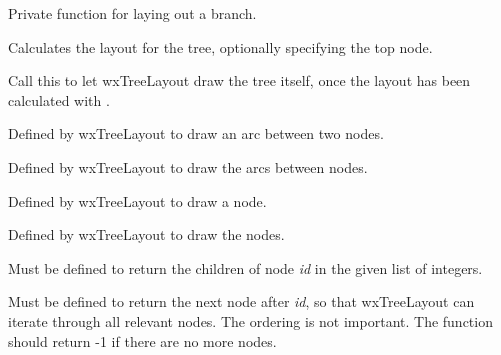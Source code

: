 

Private function for laying out a branch.

\label{dolayout}


Calculates the layout for the tree, optionally specifying the top node.

\label{draw}


Call this to let wxTreeLayout draw the tree itself, once the layout has been
calculated with .



Defined by wxTreeLayout to draw an arc between two nodes.



Defined by wxTreeLayout to draw the arcs between nodes.



Defined by wxTreeLayout to draw a node.



Defined by wxTreeLayout to draw the nodes.

\label{getchildren}


Must be defined to return the children of node {\it id} in the given list
of integers.

\label{getnextnode}


Must be defined to return the next node after {\it id}, so that wxTreeLayout can
iterate through all relevant nodes. The ordering is not important.
The function should return -1 if there are no more nodes.

